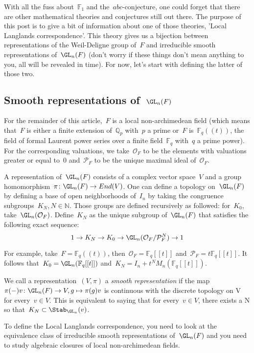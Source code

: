 With all the fuss about~$\mathbb{F}_1$ and the~$abc$-conjecture, one could forget that there are other mathematical theories and conjectures still out there. The purpose of this post is to give a bit of information about one of those theories, 'Local Langlands correspondence'. This theory gives us a bijection between representations of the Weil-Deligne group of~$F$ and irreducible smooth representations of~$\GL_n (F)$ (don't worry if these things don't mean anything to you, all will be revealed in time). For now, let's start with defining the latter of those two.

\subsection{Smooth representations of~$\GL_n(F)$}
For the remainder of this article,~$F$ is a local non-archimedean field (which means that~$F$ is either a finite extension of~$\mathbb{Q}_p$ with~$p$ a prime or~$F$ is~$\mathbb{F}_q (\!(t)\!)$, the field of formal Laurent power series over a finite field~$\mathbb{F}_q$ with~$q$ a prime power). For the corresponding valuations, we take~$\mathcal{O}_F$ to be the elements with valuations greater or equal to~$0$ and~$\mathcal{P}_F$ to be the unique maximal ideal of~$\mathcal{O}_F$.

A representation of~$\GL_n(F)$ consists of a complex vector space~$V$ and a group homomorphism~$\pi\colon\GL_n(F) \rightarrow End(V)$. One can define a topology on~$\GL_n(F)$ by defining a base of open neighborhoods of~$I_n$ by taking the congruence subgroups~$K_N, N \in \mathbb{N}$. Those groups are defined recursively as followed: for~$K_0$, take~$\GL_n (\mathcal{O}_F)$. Define~$K_N$ as the unique subgroup of~$\GL_n(F)$ that satisfies the following exact sequence:~$$ 1 \rightarrow K_N \rightarrow K_0 \rightarrow \GL_n(\mathcal{O}_F/\mathcal{P}_{F}^N)\rightarrow 1$$

For example, take~$F = \mathbb{F}_q (\!(t)\!)$, then~$\mathcal{O}_F = \mathbb{F}_q [[t]]$ and $\mathcal{P}_F = t \mathbb{F}_q [[t]]$. It follows that~$K_0 = \GL_n(\mathbb{F}_q [[t]])$ and~$K_N = I_n + t^N M_n(\mathbb{F}_q [[t]])$.

We call a representation~$(V,\pi)$ a \emph{smooth representation} if the map~$\pi(-)v\colon\GL_n(F) \rightarrow V, g \mapsto \pi(g)v$ is continuous with the discrete topology on V for every~$v \in V$. This is equivalent to saying that for every~$v \in V$, there exists a N so that~$K_N \subset \Stab_{\GL_n} (v)$.

To define the Local Langlands correspondence, you need to look at the equivalence class of irreducible smooth representations of~$\GL_n(F)$ and you need to study algebraic closures of local non-archimedean fields.


